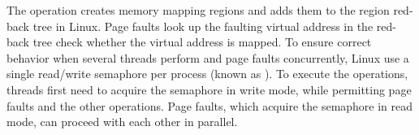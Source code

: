 %





%

The  operation creates memory mapping regions and adds them to the region red-back tree in Linux. 
Page faults look up the faulting virtual address in the red-back tree check whether the virtual address is mapped.
To ensure correct behavior when several threads perform  and page faults concurrently, Linux use a single read/write semaphore per process (known as ).
To execute the  operations, threads first need to acquire the semaphore in write mode, while permitting page faults and the other  operations.
Page faults, which acquire the semaphore in read mode, can proceed with each other in parallel. 



